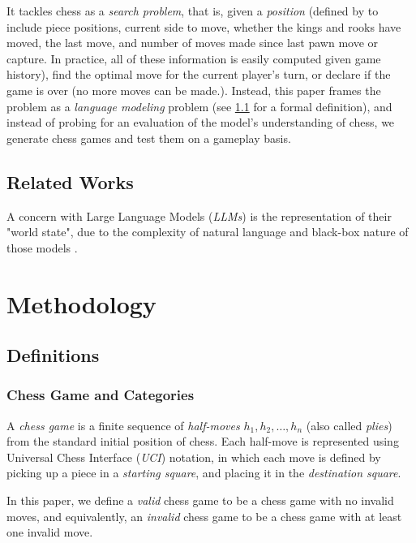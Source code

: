 \documentclass[11pt, a4paper]{article}
\begin{document}
It tackles chess as a \textit{search problem}, that is, given a \textit{position} (defined by \citet{shannon-1950} to include piece positions, current side to move, whether the kings and rooks have moved, the last move, and number of moves made since last pawn move or capture. In practice, all of these information is easily computed given game history), find the optimal move for the current player's turn, or declare if the game is over (no more moves can be made.). Instead, this paper frames the problem as a \textit{language modeling} problem (see \cref{sec:definitions} for a formal definition), and instead of probing for an evaluation of the model's understanding of chess, we generate chess games and test them on a gameplay basis. 

\subsection{Related Works}

A concern with Large Language Models (\textit{LLMs}) is the representation of their "world state", due to the complexity of natural language and black-box nature of those models \citep{toshniwal-2022}. 


\section{Methodology}

\subsection{Definitions} \label{sec:definitions}

\subsubsection{Chess Game and Categories}

A \textit{chess game} is a finite sequence of \textit{half-moves} \(h_1, h_2, \dots, h_n\) (also called \textit{plies}) from the standard initial position of chess. Each half-move is represented using Universal Chess Interface (\textit{UCI}) notation, in which each move is defined by picking up a piece in a \textit{starting square}, and placing it in the \textit{destination square}. 

In this paper, we define a \textit{valid} chess game to be a chess game with no invalid moves, and equivalently, an \textit{invalid} chess game to be a chess game with at least one invalid move.
\end{document}
